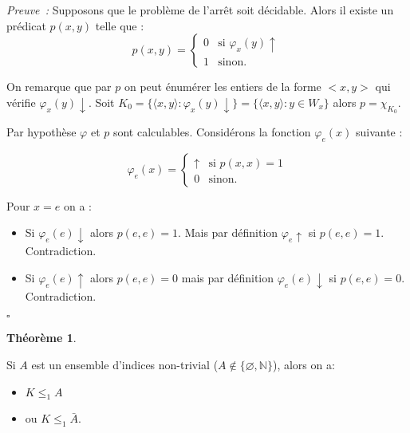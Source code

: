 \documentclass{book}
\theoremstyle{definition}
\newtheorem{theorem}{Théorème}
\numberwithin{lemma}{subsection}
\numberwithin{theorem}{subsection}
\numberwithin{definition}{subsection}
\numberwithin{proposition}{subsection}
\numberwithin{corollary}{subsection}
\numberwithin{property}{subsection}
\numberwithin{example}{subsection}
\numberwithin{heuristique}{subsection}
\numberwithin{scenario}{subsection}
\newenvironment{proofi} {\noindent\emph{Preuve~:}} {\hfill $\square$\vspace{0.2cm}}
\newcommand{\GodelFunc}[1]{\varphi_{#1}}
\newcommand{\Pairing}[1]{\langle #1 \rangle}
\begin{document}
            \begin{proofi}
            Supposons que le problème de l'arrêt soit décidable. Alors il existe un prédicat $p(x, y)$ telle que : 
            \[
                p(x, y) = \begin{cases}
                0 & \text{si }\varphi_x(y) \uparrow\\
                1 & \text{sinon}.
                \end{cases}
            \]
            
            On remarque que par $p$ on peut énumérer les entiers de la forme $<x, y>$ qui vérifie $\varphi_x(y) \downarrow$. Soit $K_0 = \{\Pairing{x, y}:\GodelFunc{x}(y)\downarrow\} = \{\Pairing{x, y}:y \in W_x\}$ alors $p = \chi_{K_0} $.
            
            Par hypothèse $\varphi$ et $p$ sont calculables. Considérons la fonction $\varphi_e(x)$ suivante : 
            
            \[
                \varphi_e(x) = \begin{cases}
                \uparrow & \text{si }p(x, x) = 1\\
                0 & \text{sinon}.
                \end{cases}
            \]
            
            Pour $x = e$ on a :
            
            \begin{itemize}
                \item Si $\varphi_e(e) \downarrow$ alors $p(e, e) = 1$. Mais par définition $\varphi_e \uparrow$ si $p(e, e) = 1$. Contradiction. 
                \item Si $\varphi_e(e) \uparrow$ alors $p(e, e) = 0$ mais par définition $\varphi_e(e) \downarrow$ si $p(e, e) = 0$. Contradiction.
            \end{itemize}
            \end{proofi}
            
            
            \begin{theorem}\label{th:ens_ind_non_trivial_non_calc}
                \par Si $A$ est un ensemble d'indices non-trivial ($A \not\in \{\varnothing, \mathbb{N}\}$), alors on a:
                \begin{itemize}
                    \item $K \leq_1 A$
                    \item ou $K \leq_1 \bar{A}$.
                \end{itemize}
            \end{theorem}
            
\end{document}

